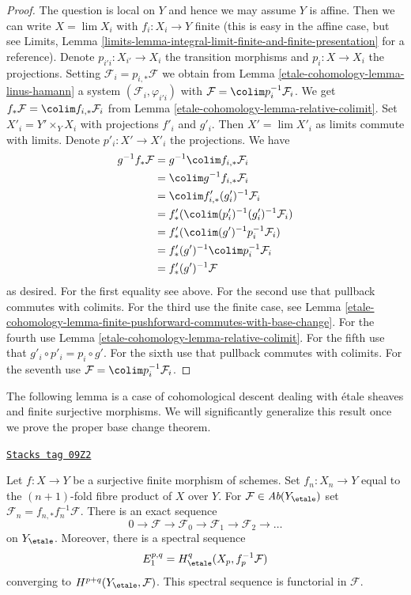 \begin{proof}
The question is local on $Y$ and hence we may assume $Y$ is affine.
Then we can write $X = \lim X_i$ with $f_i : X_i \to Y$ finite
(this is easy in the affine case, but see
Limits, Lemma \ref{limits-lemma-integral-limit-finite-and-finite-presentation}
for a reference). Denote $p_{i'i} : X_{i'} \to X_i$
the transition morphisms and $p_i : X \to X_i$ the projections.
Setting $\mathcal{F}_i = p_{i, *}\mathcal{F}$ we obtain
from Lemma \ref{etale-cohomology-lemma-linus-hamann}
a system $(\mathcal{F}_i, \varphi_{i'i})$
with $\mathcal{F} = \colim p_i^{-1}\mathcal{F}_i$.
We get $f_*\mathcal{F} = \colim f_{i, *}\mathcal{F}_i$
from Lemma \ref{etale-cohomology-lemma-relative-colimit}.
Set $X'_i = Y' \times_Y X_i$ with projections $f'_i$ and $g'_i$.
Then $X' = \lim X'_i$ as limits commute with limits.
Denote $p'_i : X' \to X'_i$ the projections. We have
\begin{align*}
g^{-1}f_*\mathcal{F}
& =
g^{-1} \colim f_{i, *}\mathcal{F}_i \\
& =
\colim g^{-1}f_{i, *}\mathcal{F}_i \\
& =
\colim f'_{i, *}(g'_i)^{-1}\mathcal{F}_i \\
& =
f'_*(\colim (p'_i)^{-1}(g'_i)^{-1}\mathcal{F}_i) \\
& =
f'_*(\colim (g')^{-1}p_i^{-1}\mathcal{F}_i) \\
& =
f'_*(g')^{-1} \colim p_i^{-1}\mathcal{F}_i \\
& =
f'_*(g')^{-1}\mathcal{F}
\end{align*}
as desired. For the first equality see above.
For the second use that pullback commutes with colimits.
For the third use the finite case, see
Lemma \ref{etale-cohomology-lemma-finite-pushforward-commutes-with-base-change}.
For the fourth use Lemma \ref{etale-cohomology-lemma-relative-colimit}.
For the fifth use that $g'_i \circ p'_i = p_i \circ g'$.
For the sixth use that pullback commutes with colimits.
For the seventh use $\mathcal{F} = \colim p_i^{-1}\mathcal{F}_i$.
\end{proof}

The following lemma is a case of cohomological descent dealing with
\'etale sheaves and finite surjective morphisms. We will significantly
generalize this result once we prove the proper base change theorem.

\begin{lemma}
\label{etale-cohomology-lemma-cohomological-descent-finite}
\href{https://stacks.math.columbia.edu/tag/09Z2}{\texttt{Stacks tag 09Z2}}

Let $f : X \to Y$ be a surjective finite morphism of schemes.
Set $f_n : X_n \to Y$ equal to the $(n + 1)$-fold fibre product
of $X$ over $Y$. For $\mathcal{F} \in \textit{Ab}(Y_\etale)$ set
$\mathcal{F}_n = f_{n, *}f_n^{-1}\mathcal{F}$. There is an exact
sequence
$$
0 \to \mathcal{F} \to \mathcal{F}_0 \to \mathcal{F}_1 \to
\mathcal{F}_2 \to \ldots
$$
on $Y_\etale$. Moreover, there is a spectral sequence
$$
E_1^{p, q} = H^q_\etale(X_p, f_p^{-1}\mathcal{F})
$$
converging to $H^{p + q}(Y_\etale, \mathcal{F})$.
This spectral sequence is functorial in $\mathcal{F}$.
\end{lemma}

